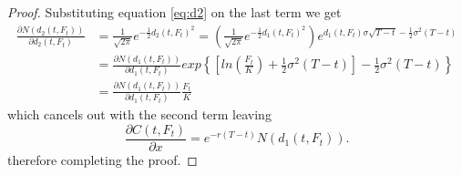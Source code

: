 \documentclass{article}
\theoremstyle{definition}
\theoremstyle{remark}
\begin{document}
\begin{proof}
Substituting equation \eqref{eq:d2} on the last term we get
\begin{align*}
\frac{\partial N(d_2(t,F_t))}{\partial d_2(t,F_t)}&= \frac{1}{\sqrt{2\pi}}e^{-\frac{1}{2}d_2(t,F_t)^2}=\left( \frac{1}{\sqrt{2\pi}}e^{-\frac{1}{2}d_1(t,F_t)^2} \right) e^{d_1(t,F_t)\sigma\sqrt{T-t}-\frac{1}{2}\sigma^2(T-t)}\\
&=\frac{\partial N(d_1(t,F_t))}{\partial d_1(t,F_t)}exp\left\{\left[ ln\left(\frac{F_t}{K}\right)+\frac{1}{2}\sigma^2(T-t)\right]-\frac{1}{2}\sigma^2(T-t)\right\}\\
&=\frac{\partial N(d_1(t,F_t))}{\partial d_1(t,F_t)}\frac{F_t}{K}
\end{align*}
which cancels out with the second term leaving
\begin{equation*}
\frac{\partial C(t,F_t)}{\partial x}=e^{-r(T-t)}N(d_1(t,F_t)).
\end{equation*}
therefore completing the proof.

\end{proof}
\end{document}
